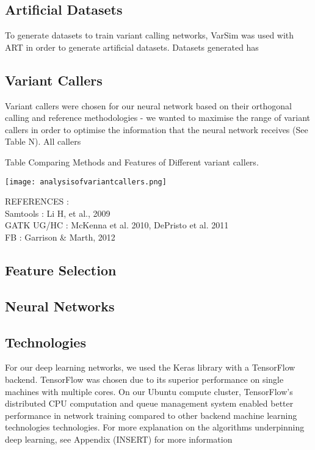 \documentclass{article}
\begin{document}
\subsection{Artificial Datasets}
To generate datasets to train variant calling networks, VarSim was used with ART in order to generate artificial datasets. Datasets generated has 


\subsection{Variant Callers}
Variant callers were chosen for our neural network based on their orthogonal calling and reference methodologies - we wanted to maximise the range of variant callers in order to optimise the information that the neural network receives (See Table N). All callers 

\begin{table}[h]
\caption{Table Comparing Methods and Features of Different variant callers.}
\texttt{[image: analysisofvariantcallers.png]}
\centering
\end{table}

REFERENCES : \\
Samtools : Li H, et al., 2009\\
GATK UG/HC : McKenna et al. 2010, DePristo et al. 2011\\
FB : Garrison \& Marth, 2012\\

\subsection{Feature Selection}

\subsection{Neural Networks}



\subsection{Technologies}
For our deep learning networks, we used the Keras library with a TensorFlow backend. TensorFlow was chosen due to its superior performance on single machines with multiple cores. On our Ubuntu compute cluster, TensorFlow's distributed CPU computation and queue management system enabled better performance in network training compared to other backend machine learning technologies technologies. For more explanation on the algorithms underpinning deep learning, see Appendix (INSERT) for more information 
\end{document}
